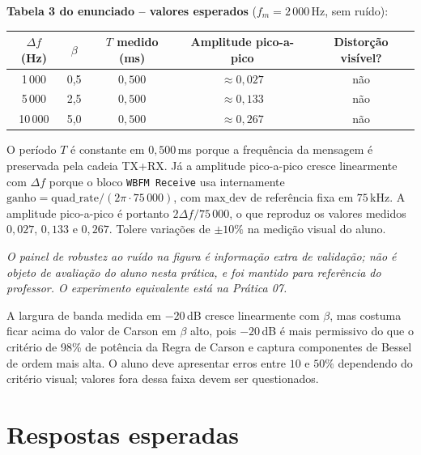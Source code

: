 \documentclass[11pt,a4paper]{article}
\begin{document}
\textbf{Tabela 3 do enunciado -- valores esperados} ($f_m = 2\,000$\,Hz, sem ruído):

\begin{tabular}{c c c c c}
  \toprule
  $\Delta f$ (Hz) & $\beta$ & $T$ medido (ms) & Amplitude pico-a-pico & Distorção visível? \\
  \midrule
  1\,000  & 0{,}5 & $0{,}500$ & $\approx 0{,}027$ & não \\
  5\,000  & 2{,}5 & $0{,}500$ & $\approx 0{,}133$ & não \\
  10\,000 & 5{,}0 & $0{,}500$ & $\approx 0{,}267$ & não \\
  \bottomrule
\end{tabular}

\begin{nota}
O período $T$ é constante em $0{,}500$\,ms porque a frequência da mensagem é
preservada pela cadeia TX+RX. Já a amplitude pico-a-pico cresce linearmente
com $\Delta f$ porque o bloco \texttt{WBFM Receive} usa internamente
$\text{ganho} = \text{quad\_rate}/(2\pi \cdot 75\,000)$, com $\text{max\_dev}$
de referência fixa em $75$\,kHz. A amplitude pico-a-pico é portanto
$2\Delta f / 75\,000$, o que reproduz os valores medidos
$0{,}027$, $0{,}133$ e $0{,}267$. Tolere variações de $\pm 10\%$ na medição
visual do aluno.
\end{nota}

\textit{O painel de robustez ao ruído na figura é informação extra de validação;
não é objeto de avaliação do aluno nesta prática, e foi mantido para referência
do professor. O experimento equivalente está na Prática 07.}

\begin{nota}
A largura de banda medida em $-20$\,dB cresce linearmente com $\beta$, mas
costuma ficar acima do valor de Carson em $\beta$ alto, pois $-20$\,dB é mais
permissivo do que o critério de 98\% de potência da Regra de Carson e captura
componentes de Bessel de ordem mais alta. O aluno deve apresentar erros entre
$10$ e $50\%$ dependendo do critério visual; valores fora dessa faixa devem
ser questionados.
\end{nota}

\section*{Respostas esperadas}
\end{document}
